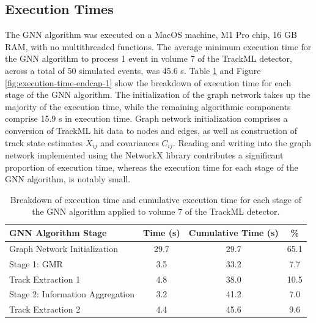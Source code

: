 \subsection{Execution Times}

The GNN algorithm was executed on a MacOS machine, M1 Pro chip, 16 GB RAM, with no multithreaded functions. The average minimum execution time for the GNN algorithm to process 1 event in volume 7 of the TrackML detector, across a total of 50 simulated events, was 45.6 s. Table \ref{tab:trackml-endcap-execution-times} and Figure \ref{fig:execution-time-endcap-1} show the breakdown of execution time for each stage of the GNN algorithm. The initialization of the graph network takes up the majority of the execution time, while the remaining algorithmic components comprise 15.9 s in execution time. Graph network initialization comprises a conversion of TrackML hit data to nodes and edges, as well as construction of track state estimates $X_{ij}$ and covariances $C_{ij}$. Reading and writing into the graph network implemented using the NetworkX library contributes a significant proportion of execution time, whereas the execution time for each stage of the GNN algorithm, is notably small.

\begin{table}[!htbp]
\caption{Breakdown of execution time and cumulative execution time for each stage of the GNN algorithm applied to volume 7 of the TrackML detector.}
\begin{center}
\begin{tabular}{lccc}
\toprule
GNN Algorithm Stage & Time (s) & Cumulative Time (s) & \% \\
\hline
Graph Network Initialization    & 29.7  & 29.7  &  65.1    \\
Stage 1: GMR                    & 3.5   & 33.2   &  7.7    \\
Track Extraction 1              & 4.8   & 38.0   &  10.5    \\
Stage 2: Information Aggregation & 3.2   & 41.2   &  7.0    \\
Track Extraction 2              & 4.4   & 45.6   &  9.6    \\
\bottomrule
\end{tabular}
\end{center}
\label{tab:trackml-endcap-execution-times}
\end{table}

